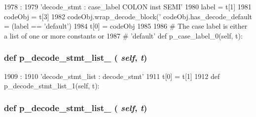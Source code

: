 \begin{DoxyCode}
1978                                    :
1979         'decode_stmt : case_label COLON inst SEMI'
1980         label = t[1]
1981         codeObj = t[3]
1982         codeObj.wrap_decode_block('         codeObj.has_decode_default = (label == 'default')
1984         t[0] = codeObj
1985 
1986     # The case label is either a list of one or more constants or
1987     # 'default'
    def p_case_label_0(self, t):
\end{DoxyCode}
\hypertarget{classisa__parser_1_1ISAParser_a1f89215837def287e1a5b4ba5edd7523}{
\subsubsection[{p\_\-decode\_\-stmt\_\-list\_\-0}]{\setlength{\rightskip}{0pt plus 5cm}def p\_\-decode\_\-stmt\_\-list\_ ( {\em self}, \/   {\em t})}}
\label{classisa__parser_1_1ISAParser_a1f89215837def287e1a5b4ba5edd7523}



\begin{DoxyCode}
1909                                      :
1910         'decode_stmt_list : decode_stmt'
1911         t[0] = t[1]
1912 
    def p_decode_stmt_list_1(self, t):
\end{DoxyCode}
\hypertarget{classisa__parser_1_1ISAParser_a006ed8d0eb79f0b238e120cbf5cf752c}{
\subsubsection[{p\_\-decode\_\-stmt\_\-list\_\-1}]{\setlength{\rightskip}{0pt plus 5cm}def p\_\-decode\_\-stmt\_\-list\_ ( {\em self}, \/   {\em t})}}
\label{classisa__parser_1_1ISAParser_a006ed8d0eb79f0b238e120cbf5cf752c}



